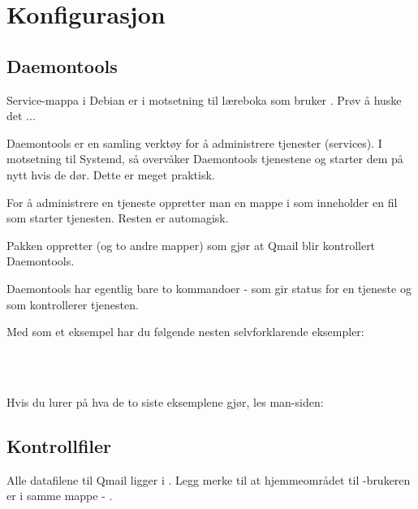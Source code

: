 
\section{Konfigurasjon}

\subsection{Daemontools}

\begin{remark}
Service-mappa i Debian er  i motsetning til
læreboka som bruker . Prøv å huske det ...
\end{remark}

Daemontools er en samling verktøy for å administrere tjenester (services).
I motsetning til Systemd, så overvåker Daemontools tjenestene og starter 
dem på nytt hvis de dør. Dette er meget praktisk.

For å administrere en tjeneste oppretter man en mappe i 
som inneholder en fil  som starter tjenesten. Resten er automagisk.

Pakken  oppretter  (og to andre mapper)
som gjør at Qmail blir kontrollert Daemontools.

Daemontools har egentlig bare to kommandoer -  som gir status for en tjeneste
og  som kontrollerer tjenesten.

Med  som et eksempel har du følgende nesten selvforklarende eksempler:

\\
\\

Hvis du lurer på hva de to siste eksemplene gjør, les man-siden:


\subsection{Kontrollfiler}

Alle datafilene til Qmail ligger i . Legg merke til 
at hjemmeområdet til -brukeren er i samme mappe - .

